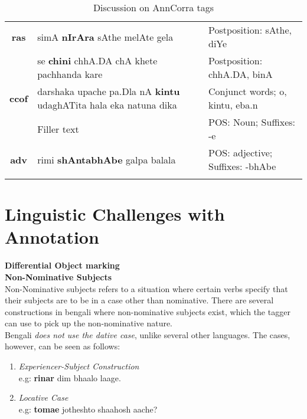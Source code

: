 \documentclass[a4 paper]{article}
\begin{document}
\begin{longtable}{cp{}p{}}
    \midrule
    \addlinespace[0.5em]
    \textbf{ras}
                 & simA \textbf{nIrAra} sAthe melAte gela
                 & Postposition: sAthe, diYe\\
    \addlinespace[0.5em]
                 & se \textbf{chini} chhA.DA chA khete pachhanda kare
                 & Postposition: chhA.DA, binA\\
    \midrule
    \addlinespace[0.5em]
    \textbf{ccof}
                 & darshaka upache pa.Dla nA \textbf{kintu} udaghATita hala eka natuna dika
                 & Conjunct words; o, kintu, eba.n\\
    \addlinespace[0.5em]
                 & Filler text
                 & POS: Noun; Suffixes: -e\\
    \midrule
    \addlinespace[0.5em]
    \textbf{adv}
                 & rimi \textbf{shAntabhAbe} galpa balala
                 & POS: adjective; Suffixes: -bhAbe\\
    \bottomrule
\caption{Discussion on AnnCorra tags}
\label{tab:anncorratable}
\end{longtable}

\section{Linguistic Challenges with Annotation}

 \textbf{Differential Object marking}\\

 \textbf{Non-Nominative Subjects}\\
Non-Nominative subjects refers to a situation where certain verbs specify that
their subjects are to be in a case other than nominative. There are several
constructions in bengali where non-nominative subjects exist, which the tagger
can use to pick up the non-nominative nature.\\
Bengali \textit{does not use the dative case}, unlike several other languages.
The cases, however, can be seen as follows:
\begin{enumerate}
    \item \textit{Experiencer-Subject Construction}\\
        e.g: \textbf{rinar} dim bhaalo laage.

    \item \textit{Locative Case}\\
        e.g: \textbf{tomae} jotheshto shaahosh aache?
\end{enumerate}
\end{document}
